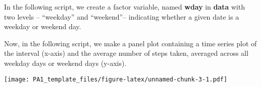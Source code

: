 \documentclass[]{article}
\newenvironment{Shaded}{\begin{snugshade}}{\end{snugshade}}
\newcommand{\KeywordTok}[1]{\textcolor[rgb]{0.13,0.29,0.53}{\textbf{#1}}}
\newcommand{\DataTypeTok}[1]{\textcolor[rgb]{0.13,0.29,0.53}{#1}}
\newcommand{\DecValTok}[1]{\textcolor[rgb]{0.00,0.00,0.81}{#1}}
\newcommand{\StringTok}[1]{\textcolor[rgb]{0.31,0.60,0.02}{#1}}
\newcommand{\OtherTok}[1]{\textcolor[rgb]{0.56,0.35,0.01}{#1}}
\newcommand{\ControlFlowTok}[1]{\textcolor[rgb]{0.13,0.29,0.53}{\textbf{#1}}}
\newcommand{\OperatorTok}[1]{\textcolor[rgb]{0.81,0.36,0.00}{\textbf{#1}}}
\newcommand{\NormalTok}[1]{#1}
\begin{document}
In the following script, we create a factor variable, named
\textbf{wday} in \textbf{data} with two levels -- ``weekday'' and
``weekend''-- indicating whether a given date is a weekday or weekend
day.

\begin{Shaded}
\end{Shaded}

Now, in the following script, we make a panel plot containing a time
series plot of the interval (x-axis) and the average number of steps
taken, averaged across all weekday days or weekend days (y-axis).

\begin{Shaded}
\end{Shaded}

\texttt{[image: PA1\_template\_files/figure-latex/unnamed-chunk-3-1.pdf]}
\end{document}
